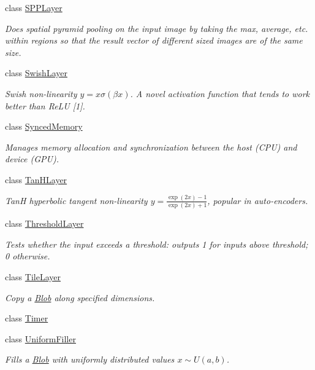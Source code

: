 \begin{DoxyCompactItemize}
class \hyperlink{classcaffe_1_1SPPLayer}{S\+P\+P\+Layer}
\begin{DoxyCompactList}\small\item\em Does spatial pyramid pooling on the input image by taking the max, average, etc. within regions so that the result vector of different sized images are of the same size. \end{DoxyCompactList}\item 
class \hyperlink{classcaffe_1_1SwishLayer}{Swish\+Layer}
\begin{DoxyCompactList}\small\item\em Swish non-\/linearity $ y = x \sigma (\beta x) $. A novel activation function that tends to work better than Re\+LU \mbox{[}1\mbox{]}. \end{DoxyCompactList}\item 
class \hyperlink{classcaffe_1_1SyncedMemory}{Synced\+Memory}
\begin{DoxyCompactList}\small\item\em Manages memory allocation and synchronization between the host (C\+PU) and device (G\+PU). \end{DoxyCompactList}\item 
class \hyperlink{classcaffe_1_1TanHLayer}{Tan\+H\+Layer}
\begin{DoxyCompactList}\small\item\em TanH hyperbolic tangent non-\/linearity $ y = \frac{\exp(2x) - 1}{\exp(2x) + 1} $, popular in auto-\/encoders. \end{DoxyCompactList}\item 
class \hyperlink{classcaffe_1_1ThresholdLayer}{Threshold\+Layer}
\begin{DoxyCompactList}\small\item\em Tests whether the input exceeds a threshold\+: outputs 1 for inputs above threshold; 0 otherwise. \end{DoxyCompactList}\item 
class \hyperlink{classcaffe_1_1TileLayer}{Tile\+Layer}
\begin{DoxyCompactList}\small\item\em Copy a \hyperlink{classcaffe_1_1Blob}{Blob} along specified dimensions. \end{DoxyCompactList}\item 
class \hyperlink{classcaffe_1_1Timer}{Timer}
\item 
class \hyperlink{classcaffe_1_1UniformFiller}{Uniform\+Filler}
\begin{DoxyCompactList}\small\item\em Fills a \hyperlink{classcaffe_1_1Blob}{Blob} with uniformly distributed values $ x\sim U(a, b) $. \end{DoxyCompactList}\item 

\end{DoxyCompactItemize}
